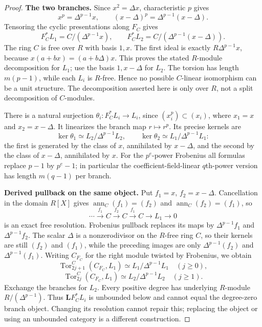 \documentclass[11pt,a4paper]{article}
\theoremstyle{named}\newtheorem{finding}{Finding}[section]
\theoremstyle{definition}\newtheorem{definition}[finding]{Definition}
\theoremstyle{remark}\newtheorem{remark}[finding]{Remark}
\begin{document}
\begin{proof}
\par\smallskip\noindent\textbf{The two branches.}\quad
Since $x^2=\Delta x$, characteristic $p$ gives
\[
 x^p=\Delta^{p-1}x,\qquad
 (x-\Delta)^p=\Delta^{p-1}(x-\Delta).
\]
Tensoring the cyclic presentations along $F_C$ gives
\[
 F_C^*L_1=C/(\Delta^{p-1}x),\qquad
 F_C^*L_2=C/(\Delta^{p-1}(x-\Delta)).
\]
The ring $C$ is free over $R$ with basis $1,x$. The first ideal is
exactly $R\Delta^{p-1}x$, because
$x(a+bx)=(a+b\Delta)x$. This proves the stated $R$-module
decomposition for $L_1$; use the basis $1,x-\Delta$ for $L_2$.
The torsion has length $m(p-1)$, while each $L_i$ is $R$-free.
Hence no possible $C$-linear isomorphism can be a unit structure.
The decomposition asserted here is only over $R$, not a split
decomposition of $C$-modules.

There is a natural surjection $\theta_i:F_C^*L_i\to L_i$,
since $(x_i^p)\subset(x_i)$, where $x_1=x$ and $x_2=x-\Delta$.
It linearizes the branch map $r\mapsto r^p$. Its precise kernels are
\[
 \ker\theta_1\simeq L_2/\Delta^{p-1}L_2,
 \qquad \ker\theta_2\simeq L_1/\Delta^{p-1}L_1:
\]
the first is generated by the class of $x$, annihilated by $x-\Delta$,
and the second by the class of $x-\Delta$, annihilated by $x$.
For the $p^e$-power Frobenius all formulas replace $p-1$ by
$p^e-1$; in particular the coefficient-field-linear $q$th-power
version has length $m(q-1)$ per branch.

\par\smallskip\noindent\textbf{Derived pullback on the same object.}\quad
Put $f_1=x$, $f_2=x-\Delta$. Cancellation in the domain $R[X]$
gives $\operatorname{ann}_C(f_1)=(f_2)$ and
$\operatorname{ann}_C(f_2)=(f_1)$, so
\[
 \cdots\xrightarrow{f_1}C\xrightarrow{f_2}C
       \xrightarrow{f_1}C\longrightarrow L_1\longrightarrow0
\]
is an exact free resolution. Frobenius pullback replaces its maps by
$\Delta^{p-1}f_1$ and $\Delta^{p-1}f_2$.
The scalar $\Delta$ is a nonzerodivisor on the $R$-free ring $C$,
so their kernels are still $(f_2)$ and $(f_1)$, while the preceding
images are only $\Delta^{p-1}(f_2)$ and $\Delta^{p-1}(f_1)$.
Writing $C_{F_C}$ for the right module twisted by Frobenius, we obtain
\[
 \operatorname{Tor}^{C}_{2j+1}(C_{F_C},L_1)
     \simeq L_1/\Delta^{p-1}L_1\quad(j\ge0),
\]
\[
 \operatorname{Tor}^{C}_{2j}(C_{F_C},L_1)
     \simeq L_2/\Delta^{p-1}L_2\quad(j\ge1).
\]
Exchange the branches for $L_2$. Every positive degree has
underlying $R$-module $R/(\Delta^{p-1})$.
Thus $\mathbf L F_C^*L_i$ is unbounded below and cannot equal the
degree-zero branch object. Changing its resolution cannot repair
this; replacing the object or using an unbounded category is a
different construction.


\end{proof}
\end{document}
